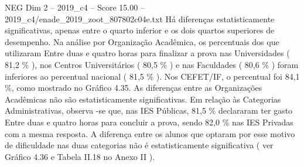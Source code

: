 \begin{textsample}{NEG Dim 2 – 2019\_c4 – Score 15.00 – 2019\_c4/enade\_2019\_zoot\_807802c04e.txt}
Há diferenças estatisticamente significativas, apenas entre o quarto inferior e os dois quartos superiores de desempenho.
Na análise por Organização Acadêmica, os percentuais dos que utilizaram Entre duas e quatro horas para finalizar a prova nas Universidades ( 81,2 \% ), nos Centros Universitários ( 80,5 \% ) e nas Faculdades ( 80,6 \% ) foram inferiores ao percentual nacional ( 81,5 \% ).
Nos CEFET/IF, o percentual foi 84,1 \%, como mostrado no Gráfico 4.35.
As diferenças entre as Organizações Acadêmicas não são estatisticamente significativas.
Em relação às Categorias Administrativas, observa -se que, nas IES Públicas, 81,5 \% declararam ter gasto Entre duas e quatro horas para concluir a prova, sendo 82,0 \% nas IES Privadas com a mesma resposta.
A diferença entre os alunos que optaram por esse motivo de dificuldade nas duas categorias não é estatisticamente significativa ( ver Gráfico 4.36 e Tabela II.18 no Anexo II ).

\end{textsample}
